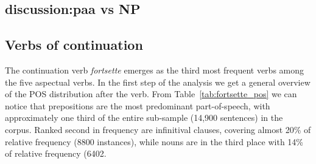 \documentclass{article}
\begin{document}
\subsection{discussion:paa vs NP}




 



\subsection{Verbs of continuation}


The continuation verb \emph{fortsette} emerges as the third most frequent verbs among the five aspectual verbs. In the first step of the analysis we get a general overview of the POS distribution after the verb. From Table~\ref{tab:fortsette_pos} we can notice that prepositions are the most predominant part-of-speech, with approximately one third of the entire sub-sample (14,900 sentences) in the corpus. Ranked second in frequency are infinitival clauses, covering almost 20\% of relative frequency (8800 instances), while nouns are in the third place with 14\% of relative frequency (6402.   
\end{document}
